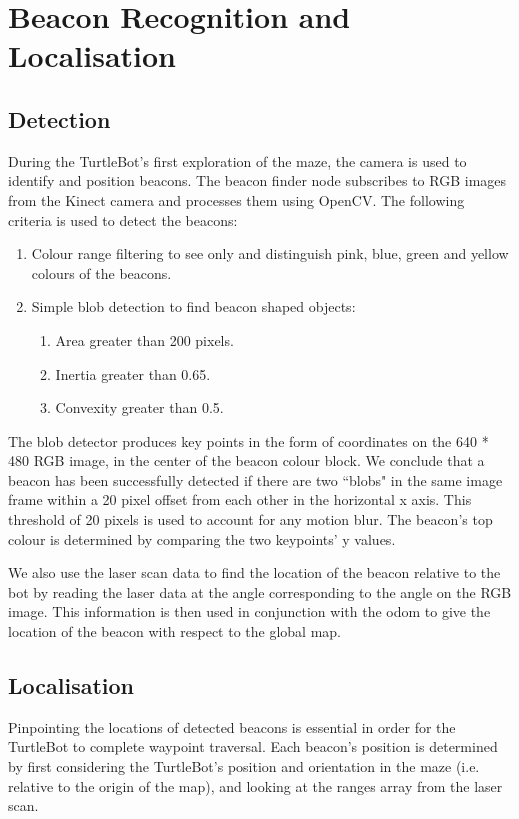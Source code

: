 \documentclass[titlepage,12pt,a4paper]{article}
\begin{document}
\pagebreak
\section{Beacon Recognition and Localisation}

\subsection{Detection}
During the TurtleBot's first exploration of the maze, the camera is used to identify and position beacons. The beacon finder node subscribes to RGB images from the Kinect camera and processes them using OpenCV. The following criteria is used to detect the beacons:

    \begin{enumerate}
        \item Colour range filtering to see only and distinguish pink, blue, green and yellow colours of the beacons.
        \item Simple blob detection to find beacon shaped objects:
        \begin{enumerate}
            \item Area greater than 200 pixels.
            \item Inertia greater than 0.65.
            \item Convexity greater than 0.5.
        \end{enumerate}
    \end{enumerate}

The blob detector produces key points in the form of coordinates on the 640 * 480 RGB image, in the center of the beacon colour block. We conclude that a beacon has been successfully detected if there are two ``blobs" in the same image frame within a 20 pixel offset from each other in the horizontal x axis. This threshold of 20 pixels is used to account for any motion blur. The beacon's top colour is determined by comparing the two keypoints' y values.

We also use the laser scan data to find the location of the beacon relative to the bot by reading the laser data at the angle corresponding to the angle on the RGB image. This information is then used in conjunction with the odom to give the location of the beacon with respect to the global map. 

\subsection{Localisation}
Pinpointing the locations of detected beacons is essential in order for the TurtleBot to complete waypoint traversal. Each beacon's position is determined by first considering the TurtleBot's position and orientation in the maze (i.e. relative to the origin of the map), and looking at the ranges array from the laser scan. 
\end{document}
